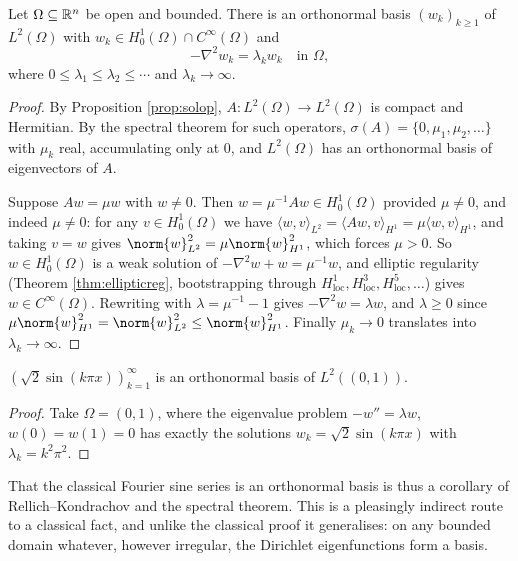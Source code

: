 \documentclass[a4paper]{scrartcl}
\newcommand{\ip}[2]{\langle #1, #2 \rangle}
\begin{document}
\begin{theorem}\label{thm:eigenvalues}
	Let $\Omega\subseteq\mathbb{R}^n$ be open and bounded. There is an orthonormal basis $(w_k)_{k\ge1}$ of $L^2(\Omega)$ with $w_k \in H_0^1(\Omega)\cap C^\infty(\Omega)$ and
	$$-\nabla^2w_k=\lambda_kw_k \quad\text{in }\Omega,$$
	where $0\le\lambda_1\le\lambda_2\le\cdots$ and $\lambda_k\to\infty$.
\end{theorem}

\begin{proof}
	By Proposition \ref{prop:solop}, $A : L^2(\Omega)\to L^2(\Omega)$ is compact and Hermitian. By the spectral theorem for such operators, $\sigma(A)=\{0,\mu_1,\mu_2,\dots\}$ with $\mu_k$ real, accumulating only at $0$, and $L^2(\Omega)$ has an orthonormal basis of eigenvectors of $A$.

	Suppose $Aw = \mu w$ with $w \ne 0$. Then $w = \mu^{-1}Aw \in H_0^1(\Omega)$ provided $\mu \ne 0$, and indeed $\mu \ne 0$: for any $v \in H_0^1(\Omega)$ we have $\ip{w}{v}_{L^2}=\ip{Aw}{v}_{H^1}=\mu\ip{w}{v}_{H^1}$, and taking $v = w$ gives $\norm{w}_{L^2}^2=\mu\norm{w}^2_{H^1}$, which forces $\mu > 0$. So $w \in H_0^1(\Omega)$ is a weak solution of $-\nabla^2w+w=\mu^{-1}w$, and elliptic regularity (Theorem \ref{thm:ellipticreg}, bootstrapping through $H^1_{\mathrm{loc}}, H^3_{\mathrm{loc}}, H^5_{\mathrm{loc}},\dots$) gives $w \in C^\infty(\Omega)$. Rewriting with $\lambda = \mu^{-1}-1$ gives $-\nabla^2w=\lambda w$, and $\lambda \ge 0$ since $\mu\norm{w}_{H^1}^2 = \norm{w}_{L^2}^2 \le \norm{w}^2_{H^1}$. Finally $\mu_k \to 0$ translates into $\lambda_k\to\infty$.
\end{proof}

\begin{corollary}
	$\left(\sqrt2\sin(k\pi x)\right)_{k=1}^\infty$ is an orthonormal basis of $L^2((0,1))$.
\end{corollary}

\begin{proof}
	Take $\Omega = (0,1)$, where the eigenvalue problem $-w''=\lambda w$, $w(0)=w(1)=0$ has exactly the solutions $w_k=\sqrt2\sin(k\pi x)$ with $\lambda_k=k^2\pi^2$.
\end{proof}

That the classical Fourier sine series is an orthonormal basis is thus a corollary of Rellich--Kondrachov and the spectral theorem. This is a pleasingly indirect route to a classical fact, and unlike the classical proof it generalises: on any bounded domain whatever, however irregular, the Dirichlet eigenfunctions form a basis.
\end{document}
